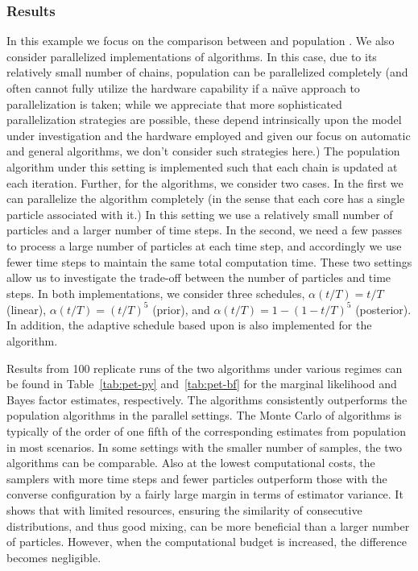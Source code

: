 \subsubsection{Results}

In this example we focus on the comparison between \smc[2] and population
\mcmc. We also consider parallelized implementations of algorithms. In this
case, due to its relatively small number of chains, population \mcmc can be
parallelized completely (and often cannot fully utilize the hardware
capability if a na\"\i ve approach to parallelization is taken; while we
appreciate that more sophisticated parallelization strategies are possible,
these depend intrinsically upon the model under investigation and the hardware
employed and given our focus on automatic and general algorithms, we don't
consider such strategies here.) The population \mcmc algorithm under this
setting is implemented such that each chain is updated at each iteration.
Further, for the \smc algorithms, we consider two cases. In the first we can
parallelize the algorithm completely (in the sense that each core has a single
particle associated with it.) In this setting we use a relatively small number
of particles and a larger number of time steps. In the second, we need a few
passes to process a large number of particles at each time step, and
accordingly we use fewer time steps to maintain the same total computation
time. These two settings allow us to investigate the trade-off between the
number of particles and time steps. In both implementations, we consider three
schedules, $\alpha(t/T) = t/T$ (linear), $\alpha(t/T) = (t/T)^5$ (prior), and
$\alpha(t/T) = 1 - (1 - t/T)^5$ (posterior). In addition, the adaptive
schedule based upon \cess is also implemented for the \smc[2] algorithm.

Results from 100 replicate runs of the two algorithms under various regimes
can be found in Table~\ref{tab:pet-py} and~\ref{tab:pet-bf} for the marginal
likelihood and Bayes factor estimates, respectively. The \smc algorithms
consistently outperforms the population \mcmc algorithms in the parallel
settings. The Monte Carlo \sd of \smc algorithms is typically of the order of
one fifth of the corresponding estimates from population \mcmc in most
scenarios. In some settings with the smaller number of samples, the two
algorithms can be comparable. Also at the lowest computational costs, the
samplers with more time steps and fewer particles outperform those with the
converse configuration by a fairly large margin in terms of estimator
variance. It shows that with limited resources, ensuring the similarity of
consecutive distributions, and thus good mixing, can be more beneficial than a
larger number of particles. However, when the computational budget is
increased, the difference becomes negligible.

